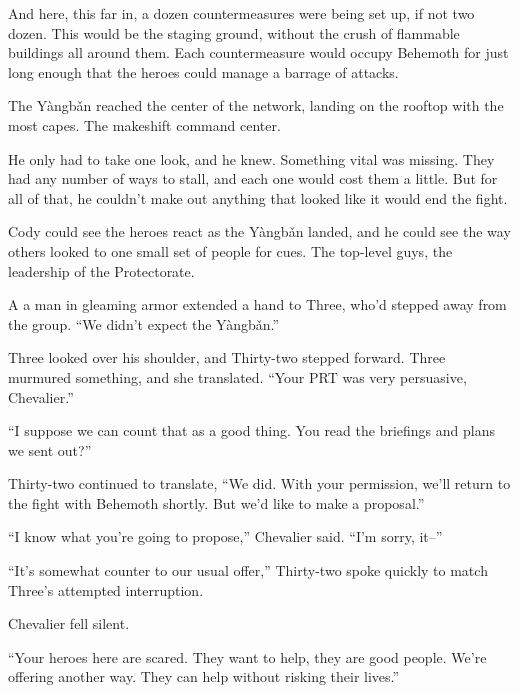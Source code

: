 And here, this far in, a dozen countermeasures were being set up, if not two dozen.  This would be the staging ground, without the crush of flammable buildings all around them.  Each countermeasure would occupy Behemoth for just long enough that the heroes could manage a barrage of attacks.



The Y\`{a}ngb\v{a}n reached the center of the network, landing on the rooftop with the most capes.  The makeshift command center.



He only had to take one look, and he knew.  Something vital was missing.  They had any number of ways to stall, and each one would cost them a little.  But for all of that, he couldn't make out anything that looked like it would end the fight.



Cody could see the heroes react as the Y\`{a}ngb\v{a}n landed, and he could see the way others looked to one small set of people for cues.  The top-level guys, the leadership of the Protectorate.



A a man in gleaming armor extended a hand to Three, who'd stepped away from the group.  ``We didn't expect the Y\`{a}ngb\v{a}n.''



Three looked over his shoulder, and Thirty-two stepped forward.  Three murmured something, and she translated.  ``Your PRT was very persuasive, Chevalier.''



``I suppose we can count that as a good thing.  You read the briefings and plans we sent out?''



Thirty-two continued to translate, ``We did.  With your permission, we'll return to the fight with Behemoth shortly.  But we'd like to make a proposal.''



``I know what you're going to propose,'' Chevalier said.  ``I'm sorry, it--''



``It's somewhat counter to our usual offer,'' Thirty-two spoke quickly to match Three's attempted interruption.



Chevalier fell silent.



``Your heroes here are scared.  They want to help, they are good people.  We're offering another way.  They can help without risking their lives.''



